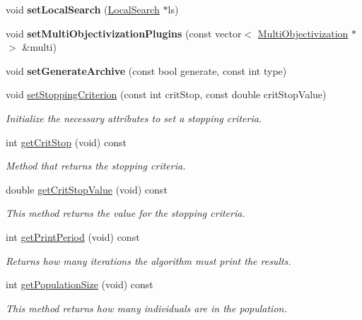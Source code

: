 \begin{DoxyCompactItemize}
void {\bfseries set\+Local\+Search} (\mbox{\hyperlink{classLocalSearch}{Local\+Search}} $\ast$ls)
\item 
\mbox{\label{classEA_a73cb790a9ba0a552096613522c13d6cf}} 
void {\bfseries set\+Multi\+Objectivization\+Plugins} (const vector$<$ \mbox{\hyperlink{classMultiObjectivization}{Multi\+Objectivization}} $\ast$$>$ \&multi)
\item 
\mbox{\label{classEA_a4e6f4130156dc99c0c44f9d7b9903a25}} 
void {\bfseries set\+Generate\+Archive} (const bool generate, const int type)
\item 
void \mbox{\hyperlink{classEA_a61c0385f3596233e124a9002e834fc6a}{set\+Stopping\+Criterion}} (const int crit\+Stop, const double crit\+Stop\+Value)
\begin{DoxyCompactList}\small\item\em Initialize the necessary attributes to set a stopping criteria. \end{DoxyCompactList}\item 
int \mbox{\hyperlink{classEA_a6ec89c4b5edec15a2c59f8f640522169}{get\+Crit\+Stop}} (void) const
\begin{DoxyCompactList}\small\item\em Method that returns the stopping criteria. \end{DoxyCompactList}\item 
double \mbox{\hyperlink{classEA_a53c6bb76e024220eae10799b732d1571}{get\+Crit\+Stop\+Value}} (void) const
\begin{DoxyCompactList}\small\item\em This method returns the value for the stopping criteria. \end{DoxyCompactList}\item 
int \mbox{\hyperlink{classEA_af3137eadac064eb1257ec161150fb304}{get\+Print\+Period}} (void) const
\begin{DoxyCompactList}\small\item\em Returns how many iterations the algorithm must print the results. \end{DoxyCompactList}\item 
int \mbox{\hyperlink{classEA_a107a7507708a8a4db8ca2dfbef72f52c}{get\+Population\+Size}} (void) const
\begin{DoxyCompactList}\small\item\em This method returns how many individuals are in the population. \end{DoxyCompactList}\item 
$$
\end{DoxyCompactItemize}
